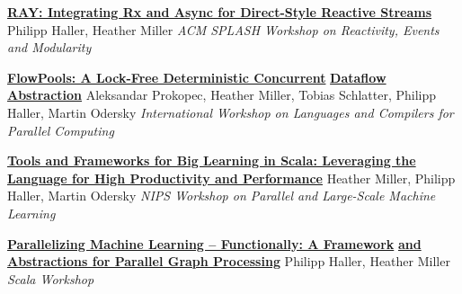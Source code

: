 \documentclass[9pt]{article}
\begin{document}
\noindent\href{http://infoscience.epfl.ch/record/188383}{\bf RAY: Integrating Rx and Async for Direct-Style Reactive Streams}
\newline\noindent Philipp Haller, Heather Miller
\newline\noindent\emph{ACM SPLASH Workshop on Reactivity, Events and Modularity}
\bigskip

\noindent\href{http://infoscience.epfl.ch/record/180265}{\bf FlowPools: A Lock-Free Deterministic Concurrent}\vspace{-0.03in}
\newline\noindent\href{http://infoscience.epfl.ch/record/180265}{\bf Dataflow Abstraction}
\newline\noindent Aleksandar Prokopec, Heather Miller, Tobias Schlatter,
\newline\noindent Philipp Haller, Martin Odersky
\newline\noindent\emph{International Workshop on Languages and Compilers for Parallel Computing}
\vspace{0.03in}
\newline{}
\vspace{-0.03in}
\newline{}
\vspace{-0.03in}
\newline{}
\bigskip

\noindent\href{http://infoscience.epfl.ch/record/170032}{\bf Tools and Frameworks for Big Learning in Scala: Leveraging the}\vspace{-0.03in}
\newline\noindent\href{http://infoscience.epfl.ch/record/170032}{\bf Language for High Productivity and Performance}
\newline\noindent Heather Miller, Philipp Haller, Martin Odersky
\newline\noindent\emph{NIPS Workshop on Parallel and Large-Scale Machine Learning}
\bigskip

\noindent\href{http://infoscience.epfl.ch/record/165111}{\bf Parallelizing Machine Learning -- Functionally: A Framework}\vspace{-0.03in}
\newline\noindent\href{http://infoscience.epfl.ch/record/165111}{\bf and Abstractions for Parallel Graph Processing}
\newline\noindent Philipp Haller, Heather Miller
\newline\noindent\emph{Scala Workshop}
\bigskip
\end{document}

